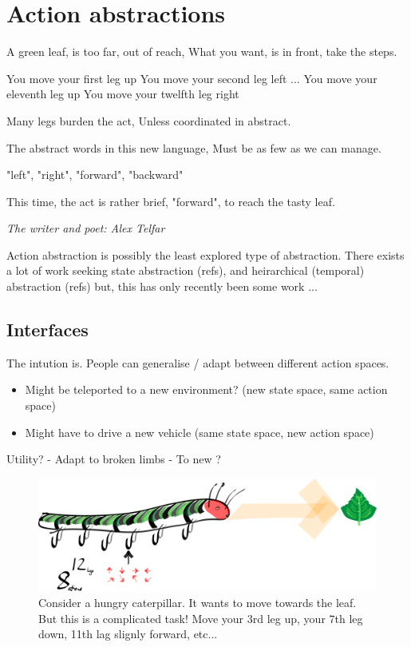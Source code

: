 \section{Action abstractions}


\epigraph{
A green leaf, is too far, out of reach,
What you want, is in front, take the steps.

You move your first leg up You move your second leg left ... You move your eleventh leg up You move your twelfth leg right

Many legs burden the act,
Unless coordinated in abstract.

The abstract words in this new language,
Must be as few as we can manage.

"left", "right", "forward", "backward"

This time, the act is rather brief,
"forward", to reach the tasty leaf.
}{\textit{The writer and poet: Alex Telfar}}


Action abstraction is possibly the least explored type of abstraction.
There exists a lot of work seeking state abstraction (refs), and heirarchical (temporal) abstraction (refs)
but, this has only recently been some work ...

\subsection{Interfaces}

The intution is.
People can generalise / adapt between different action spaces.

\begin{itemize}
\tightlist
\item
  Might be teleported to a new environment? (new state space, same
  action space)
\item
  Might have to drive a new vehicle (same state space, new action space)
\end{itemize}


Utility?
- Adapt to broken limbs
- To new ?


\begin{figure}
\centering
\includegraphics[width=\textwidth,height=0.25\textheight]{../../pictures/drawings/hungry-caterpillar.png}
\caption{Consider a hungry caterpillar. It wants to move towards the leaf. But this is a complicated task! Move your 3rd leg up, your 7th leg down, 11th lag slignly forward, etc...}
\end{figure}


